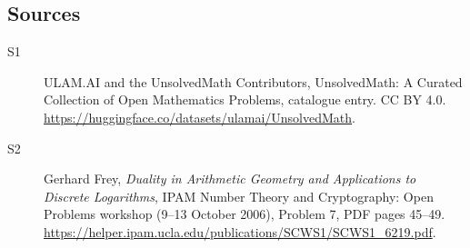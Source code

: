 \documentclass[11pt]{article}
\begin{document}
\subsection{Sources}
\begin{description}
\item[\hypertarget{source:statement:1}{S1}] ULAM.AI and the UnsolvedMath Contributors, UnsolvedMath: A Curated Collection of Open Mathematics Problems, catalogue entry. CC BY 4.0. \url{https://huggingface.co/datasets/ulamai/UnsolvedMath}.
\item[\hypertarget{source:statement:2}{S2}] Gerhard Frey, \emph{Duality in Arithmetic Geometry and Applications to Discrete Logarithms}, IPAM Number Theory and Cryptography: Open Problems workshop (9--13 October 2006), Problem 7, PDF pages 45--49. \url{https://helper.ipam.ucla.edu/publications/SCWS1/SCWS1_6219.pdf}.
\end{description}
\label{end:statement}
\end{document}
